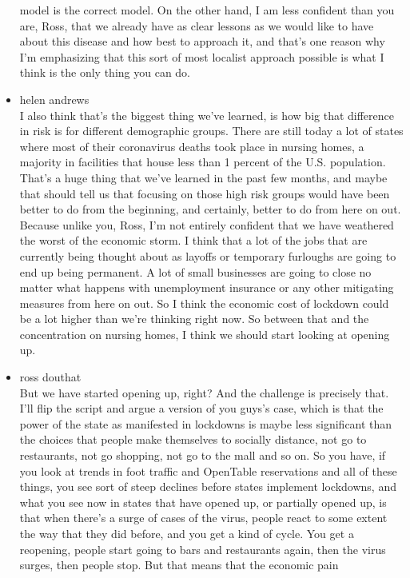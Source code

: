 \begin{itemize}
  model is the correct model. On the other hand, I am less confident
  than you are, Ross, that we already have as clear lessons as we would
  like to have about this disease and how best to approach it, and
  that's one reason why I'm emphasizing that this sort of most localist
  approach possible is what I think is the only thing you can do.
\item
  helen andrews\\
  I also think that's the biggest thing we've learned, is how big that
  difference in risk is for different demographic groups. There are
  still today a lot of states where most of their coronavirus deaths
  took place in nursing homes, a majority in facilities that house less
  than 1 percent of the U.S. population. That's a huge thing that we've
  learned in the past few months, and maybe that should tell us that
  focusing on those high risk groups would have been better to do from
  the beginning, and certainly, better to do from here on out. Because
  unlike you, Ross, I'm not entirely confident that we have weathered
  the worst of the economic storm. I think that a lot of the jobs that
  are currently being thought about as layoffs or temporary furloughs
  are going to end up being permanent. A lot of small businesses are
  going to close no matter what happens with unemployment insurance or
  any other mitigating measures from here on out. So I think the
  economic cost of lockdown could be a lot higher than we're thinking
  right now. So between that and the concentration on nursing homes, I
  think we should start looking at opening up.
\item
  ross douthat\\
  But we have started opening up, right? And the challenge is precisely
  that. I'll flip the script and argue a version of you guys's case,
  which is that the power of the state as manifested in lockdowns is
  maybe less significant than the choices that people make themselves to
  socially distance, not go to restaurants, not go shopping, not go to
  the mall and so on. So you have, if you look at trends in foot traffic
  and OpenTable reservations and all of these things, you see sort of
  steep declines before states implement lockdowns, and what you see now
  in states that have opened up, or partially opened up, is that when
  there's a surge of cases of the virus, people react to some extent the
  way that they did before, and you get a kind of cycle. You get a
  reopening, people start going to bars and restaurants again, then the
  virus surges, then people stop. But that means that the economic pain

\end{itemize}
